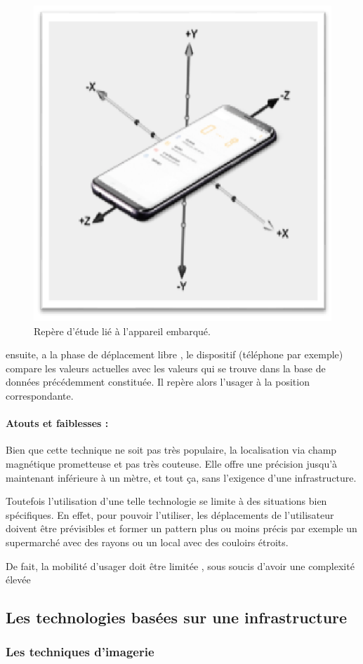 \documentclass[12pt,a4paper]{report}
\begin{document}
	\begin{figure}[h]
		\centering
		\includegraphics[width=0.4\linewidth]{Pics/position.png}
		\caption{Repère d’étude lié à l’appareil embarqué.}
		\label{fig:position}
	\end{figure}

ensuite, a la phase de déplacement libre , le dispositif (téléphone par exemple) compare les valeurs actuelles avec les valeurs qui se trouve dans la base de données précédemment constituée. Il repère alors l’usager à la position correspondante.


 \paragraph{Atouts et faiblesses :}

Bien que cette technique ne soit pas très populaire, la localisation via champ magnétique prometteuse et pas très couteuse. Elle offre une précision jusqu’à maintenant inférieure à un mètre, et tout ça, sans l’exigence d’une infrastructure. 

Toutefois l’utilisation d’une telle technologie se limite à des situations bien spécifiques. En effet, pour pouvoir l’utiliser, les déplacements de l’utilisateur doivent être prévisibles et former un pattern plus ou moins précis par exemple un supermarché avec des rayons ou un local avec des couloirs étroits.

De fait, la mobilité d'usager doit être limitée , sous soucis d’avoir une complexité élevée
	


\subsection{Les technologies basées sur une infrastructure}

\subsubsection{ Les techniques d’imagerie}
\end{document}
